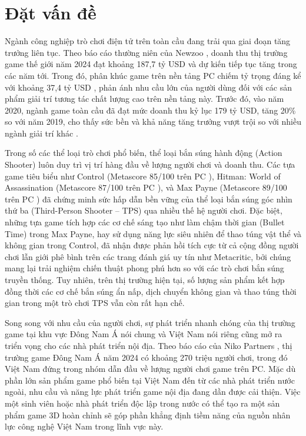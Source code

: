 \documentclass[../DoAn.tex]{subfiles}
\begin{document}
\section{Đặt vấn đề}
\label{section:1.1}

Ngành công nghiệp trò chơi điện tử trên toàn cầu đang trải qua giai đoạn tăng trưởng liên tục. Theo báo cáo thường niên của Newzoo \cite{Newzoo2024}, doanh thu thị trường game thế giới năm 2024 đạt khoảng 187,7 tỷ USD và dự kiến tiếp tục tăng trong các năm tới. Trong đó, phân khúc game trên nền tảng PC chiếm tỷ trọng đáng kể với khoảng 37,4 tỷ USD \cite{Newzoo2024}, phản ánh nhu cầu lớn của người dùng đối với các sản phẩm giải trí tương tác chất lượng cao trên nền tảng này. Trước đó, vào năm 2020, ngành game toàn cầu đã đạt mức doanh thu kỷ lục 179 tỷ USD, tăng 20\% so với năm 2019, cho thấy sức bền và khả năng tăng trưởng vượt trội so với nhiều ngành giải trí khác \cite{Witkowski2020}.

Trong số các thể loại trò chơi phổ biến, thể loại bắn súng hành động (Action Shooter) luôn duy trì vị trí hàng đầu về lượng người chơi và doanh thu. Các tựa game tiêu biểu như Control (Metascore 85/100 trên PC \cite{MetacriticControl}), Hitman: World of Assassination (Metascore 87/100 trên PC \cite{MetacriticHitman3}), và Max Payne (Metascore 89/100 trên PC \cite{MetacriticMaxPayne}) đã chứng minh sức hấp dẫn bền vững của thể loại bắn súng góc nhìn thứ ba (Third-Person Shooter -- TPS) qua nhiều thế hệ người chơi. Đặc biệt, những tựa game tích hợp các cơ chế sáng tạo như làm chậm thời gian (Bullet Time) trong Max Payne, hay sử dụng năng lực siêu nhiên để thao túng vật thể và không gian trong Control, đã nhận được phản hồi tích cực từ cả cộng đồng người chơi lẫn giới phê bình trên các trang đánh giá uy tín như Metacritic, bởi chúng mang lại trải nghiệm chiến thuật phong phú hơn so với các trò chơi bắn súng truyền thống. Tuy nhiên, trên thị trường hiện tại, số lượng sản phẩm kết hợp đồng thời các cơ chế bắn súng ẩn nấp, dịch chuyển không gian và thao túng thời gian trong một trò chơi TPS vẫn còn rất hạn chế.

Song song với nhu cầu của người chơi, sự phát triển nhanh chóng của thị trường game tại khu vực Đông Nam Á nói chung và Việt Nam nói riêng cũng mở ra triển vọng cho các nhà phát triển nội địa. Theo báo cáo của Niko Partners \cite{NikoPartners2024}, thị trường game Đông Nam Á năm 2024 có khoảng 270 triệu người chơi, trong đó Việt Nam đứng trong nhóm dẫn đầu về lượng người chơi game trên PC. Mặc dù phần lớn sản phẩm game phổ biến tại Việt Nam đến từ các nhà phát triển nước ngoài, nhu cầu và năng lực phát triển game nội địa đang dần được cải thiện. Việc một sinh viên hoặc nhà phát triển độc lập trong nước có thể tạo ra một sản phẩm game 3D hoàn chỉnh sẽ góp phần khẳng định tiềm năng của nguồn nhân lực công nghệ Việt Nam trong lĩnh vực này.
\end{document}
